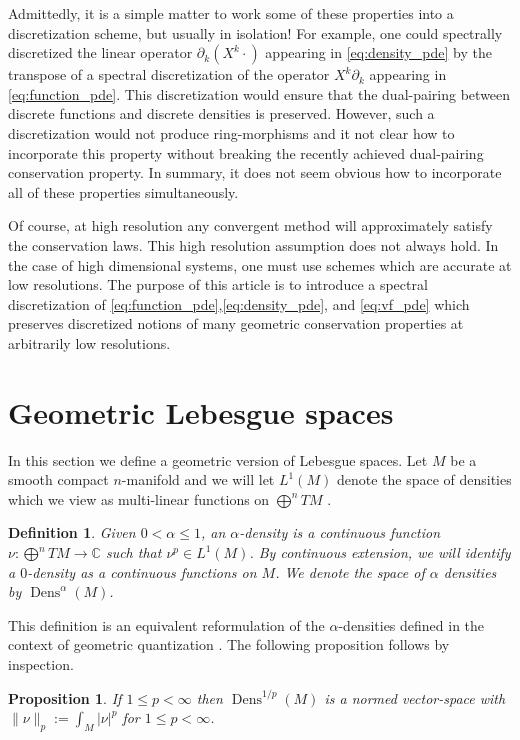 \documentclass[12pt]{amsart}
\newtheorem{prop}[thm]{Proposition}
\newtheorem{defn}[thm]{Definition}
\DeclareMathOperator{\Dens}{Dens}
\begin{document}
Admittedly, it is a simple matter to work some of these properties into a discretization scheme,
but usually in isolation!
For example, one could spectrally discretized the linear operator  $\partial_k (X^k \cdot )$ appearing in \eqref{eq:density_pde} by the transpose of
a spectral discretization of the operator $X^k \partial_k$ appearing in \eqref{eq:function_pde}.
This discretization would ensure that the dual-pairing between discrete functions and discrete densities is preserved.
However, such a discretization would not produce ring-morphisms and it not clear how to incorporate this
property without breaking the recently achieved dual-pairing conservation property.
In summary, it does not seem obvious how to incorporate all of these properties simultaneously.

Of course, at high resolution any convergent method will approximately satisfy the conservation laws.
This high resolution assumption does not always hold.
In the case of high dimensional systems, one must use schemes which are accurate at low resolutions.
The purpose of this article is to introduce a spectral discretization of \eqref{eq:function_pde},\eqref{eq:density_pde}, and \eqref{eq:vf_pde}
which preserves discretized notions of many geometric conservation properties at arbitrarily low resolutions.

\section{Geometric Lebesgue spaces}
\label{sec:densities}
In this section we define a geometric version of Lebesgue spaces.
Let $M$ be a smooth compact $n$-manifold
and we will let $L^1(M)$ denote the space of densities
which we view as multi-linear functions on $\bigoplus^n TM$ \cite[Chapter 16]{Lee2006}.

\begin{defn}\label{def:p-density}
	Given $0 < \alpha \leq 1$, an $\alpha$-density is a continuous function $\nu : \bigoplus^n TM \to \mathbb{C}$
	such that $\nu^{p} \in L^1(M)$.
	By continuous extension, we will identify a $0$-density as a continuous functions on $M$.
	We denote the space of $\alpha$ densities by $\Dens^{\alpha}(M)$.
\end{defn}

This definition is an equivalent reformulation of the $\alpha$-densities defined in the context of geometric quantization \cite{GuilleminSternberg1970,BatesWeinstein1997}.
The following proposition follows by inspection.
\begin{prop}
	If $1 \leq p < \infty$ then $\Dens^{1/p}(M)$ is a normed vector-space with $\| \nu \|_p := \int_M |\nu|^p$ for $1 \leq p < \infty$.
\end{prop}
\end{document}
